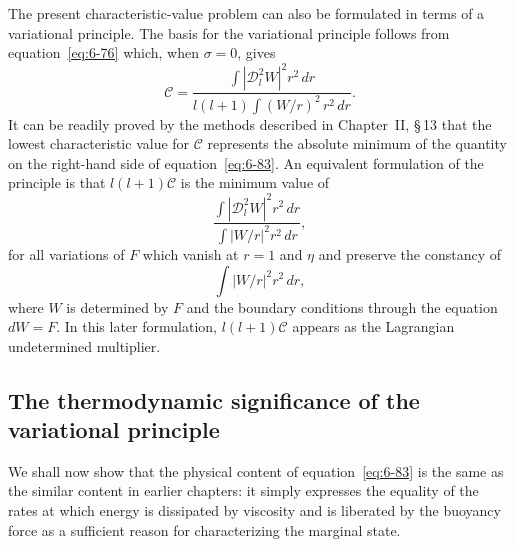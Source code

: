 The present characteristic-value problem can also be formulated in
terms of a variational principle. The basis for the variational principle
follows from equation~\eqref{eq:6-76} which, when $\sigma = 0$, gives
\begin{equation}\label{eq:6-83}
\mathcal{C} = \frac{\displaystyle\int |\mathscr{D}_l^2 W|^2 r^2\,dr}{\displaystyle l(l+1)\int (W/r)^2\, r^2\,dr}.
\end{equation}
It can be readily proved by the methods described in Chapter~II, \S\,13
that the lowest characteristic value for $\mathcal{C}$ represents the absolute
minimum of the quantity on the right-hand side of equation~\eqref{eq:6-83}. An
equivalent formulation of the principle is that $l(l+1)\mathcal{C}$ is the minimum
value of
\begin{equation}\label{eq:6-84}
\frac{\displaystyle\int |\mathscr{D}_l^2 W|^2 r^2\,dr}{\displaystyle \int |W/r|^2 r^2\,dr},
\end{equation}
for all variations of $F$ which vanish at $r = 1$ and $\eta$ and preserve the
constancy of
\begin{equation}\label{eq:6-85}
\int|W/r|^2 r^2\,dr,
\end{equation}
where $W$ is determined by $F$ and the boundary conditions through the
equation $dW = F$. In this later formulation, $l(l+1)\mathcal{C}$ appears as
the Lagrangian undetermined multiplier.

\subsection{The thermodynamic significance of the variational principle}\label{sec:58a}
We shall now show that the physical content of equation~\eqref{eq:6-83} is the
same as the similar content in earlier chapters: it simply expresses
the equality of the rates at which energy is dissipated by viscosity and is
liberated by the buoyancy force as a sufficient reason for characterizing
the marginal state.

